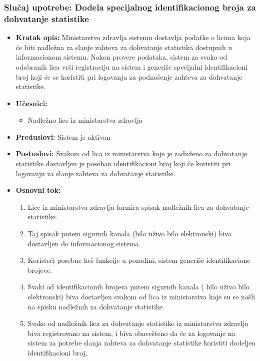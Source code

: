 \documentclass[titlepage]{article}
\begin{document}
\subsubsection{Slučaj upotrebe: Dodela specijalnog identifikacionog broja za dohvatanje statistike }
\begin{itemize}
    
\item \textbf{Kratak opis:} Ministarstvo zdravlja sistemu dostavlja podatke  o licima koja \'{c}e biti nadle\v{z}na za slanje zahteva za dohvatanje statistika dostupnih u informacionom sistemu. Nakon provere podataka, sistem za svako od odabranih lica vr\v{s}i registraciju na sistem i generi\v{s}e specijalni identifikacioni broj koji će se koristiti pri logovanju za podno\v{s}enje zahteva za dohvatanje statistike. 
\item \textbf{Učesnici:}
\begin{itemize}
    \item Nadle\v{z}no lice iz ministarstva zdravlja
\end{itemize}
 \item \textbf{Preduslovi:} Sistem je aktivan
 \item \textbf{Postuslovi:} Svakom od lica iz ministarstva koje je zadu\v{z}eno za dohvatanje statistike dostavljen je poseban identifikacioni broj koji će koristiti pri logovanju za slanje zahteva za dohvatanje statistike. 
 \item \textbf{Osnovni tok:}
 \begin{enumerate}
    \item Lice iz ministarstva zdravlja formira spisak nadle\v{z}nih lica za dohvatanje statistike.
    \item Taj spisak putem sigurnih kanala (bilo uživo bilo elektronski) biva dostavljen do informacionog sistema.
    \item Koriste\'{c}i posebne he\v{s} funkcije u pozadini, sistem generi\v{s}e identifikacione brojeve.
    \item Svaki od identifikacionih brojeva putem sigurnih kanala ( bilo u\v{z}ivo bilo elektronski) biva dostavljen svakom od lica iz ministarstva koje su se na\v{s}li na spisku nadle\v{z}nih za dohvatanje statistike.
    \item Svako od nadle\v{z}nih lica za dohvatanje statistike iz ministarstva zdravlja biva registrovano na sistem, i biva obave\v{s}teno da \'{c}e za logovanje na sistem za potrebe slanja zahteva za dohvatanje statistike koristiti dodeljen identifikacioni broj.
 \end{enumerate}
\end{itemize}
\end{document}
